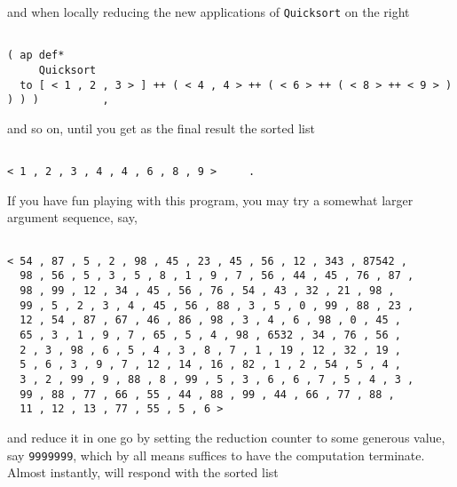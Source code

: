 and when locally reducing the new applications of {\tt Quicksort} on the right
\begin{verbatim}

( ap def*
     Quicksort
  to [ < 1 , 2 , 3 > ] ++ ( < 4 , 4 > ++ ( < 6 > ++ ( < 8 > ++ < 9 > ) ) ) )          ,

\end{verbatim}
and so on, until you get as the final result the sorted list
\begin{verbatim}

< 1 , 2 , 3 , 4 , 4 , 6 , 8 , 9 >     .

\end{verbatim}
If you have fun playing with this program, you may try a somewhat larger argument sequence, say,
\begin{verbatim}

< 54 , 87 , 5 , 2 , 98 , 45 , 23 , 45 , 56 , 12 , 343 , 87542 ,
  98 , 56 , 5 , 3 , 5 , 8 , 1 , 9 , 7 , 56 , 44 , 45 , 76 , 87 ,
  98 , 99 , 12 , 34 , 45 , 56 , 76 , 54 , 43 , 32 , 21 , 98 ,
  99 , 5 , 2 , 3 , 4 , 45 , 56 , 88 , 3 , 5 , 0 , 99 , 88 , 23 ,
  12 , 54 , 87 , 67 , 46 , 86 , 98 , 3 , 4 , 6 , 98 , 0 , 45 ,
  65 , 3 , 1 , 9 , 7 , 65 , 5 , 4 , 98 , 6532 , 34 , 76 , 56 ,
  2 , 3 , 98 , 6 , 5 , 4 , 3 , 8 , 7 , 1 , 19 , 12 , 32 , 19 ,
  5 , 6 , 3 , 9 , 7 , 12 , 14 , 16 , 82 , 1 , 2 , 54 , 5 , 4 ,
  3 , 2 , 99 , 9 , 88 , 8 , 99 , 5 , 3 , 6 , 6 , 7 , 5 , 4 , 3 ,
  99 , 88 , 77 , 66 , 55 , 44 , 88 , 99 , 44 , 66 , 77 , 88 ,
  11 , 12 , 13 , 77 , 55 , 5 , 6 >

\end{verbatim}
and reduce it in one go by setting the reduction counter to  some generous value, say 
{\tt 9999999}, which by all means suffices to have the computation terminate. Almost instantly,
\pired will respond with the sorted list
